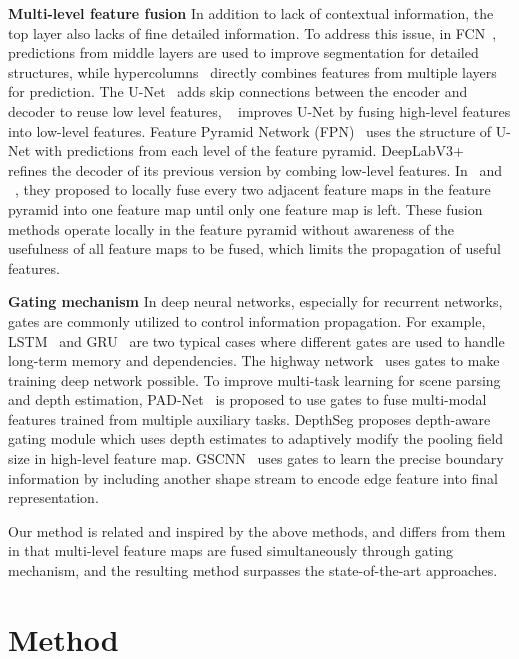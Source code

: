 \documentclass[letterpaper]{article} \usepackage{aaai20}  \usepackage{times}  \usepackage{helvet} \usepackage{courier}  \usepackage[hyphens]{url}  \usepackage{graphicx} \urlstyle{rm} \def\UrlFont{\rm}  \usepackage{graphicx}  \usepackage{amsmath}
\begin{document}
\noindent
\textbf{Multi-level feature fusion}
 In addition to lack of contextual information, the top layer also lacks of fine detailed information. To address this issue, in FCN~\cite{fcn}, predictions from middle layers are used to improve segmentation for detailed structures, while hypercolumns~\cite{hypercol} directly combines features from multiple layers for prediction. The U-Net~\cite{unet} adds skip connections between the encoder and decoder to reuse low level features, ~\cite{Exfuse} improves U-Net by fusing high-level features into low-level features. Feature Pyramid Network (FPN)~\cite{fpn} uses the structure of U-Net with predictions from each level of the feature pyramid. DeepLabV3+~\cite{deeplabv3p} refines the decoder of its previous version by combing low-level features. In~\cite{msci} and ~\cite{ding2018context}, they proposed to locally fuse every two adjacent feature maps in the feature pyramid into one feature map until only one feature map is left. These fusion methods operate locally in the feature pyramid without awareness of the usefulness of all feature maps to be fused, which limits the propagation of useful features.

\noindent
\textbf{Gating mechanism}
  In deep neural networks, especially for recurrent networks, gates are commonly utilized to control information propagation. For example, LSTM~\cite{lstm} and GRU~\cite{gru} are two typical cases where different gates are used to handle long-term memory and dependencies. The highway network~\cite{highway} uses gates to make training deep network possible. To improve multi-task learning for scene parsing and depth estimation, PAD-Net~\cite{PAD-net} is proposed to use gates to fuse multi-modal features trained from multiple auxiliary tasks. DepthSeg\cite{depthseg} proposes depth-aware gating module which uses depth estimates to adaptively modify the pooling field size in high-level feature map. GSCNN~\cite{gated-scnn} uses gates to learn the precise boundary information by including another shape stream to encode edge feature into final representation. 
  
  Our method is related and inspired by the above methods, and differs from them in that multi-level feature maps are fused simultaneously through gating mechanism, and the resulting method surpasses the state-of-the-art approaches. \section{Method}
\end{document}
